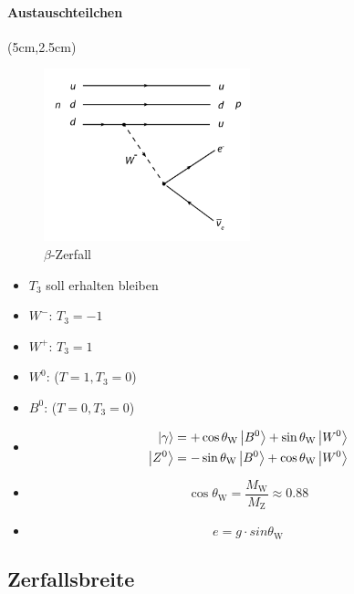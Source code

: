 \begin{iframe}


	\framesubtitle{Austauschteilchen}
	\begin{textblock*}{7cm}(5cm,2.5cm) %
		\begin{figure}
		\includegraphics[height=5cm]{img/betadecay}
		\caption*{$\beta$-Zerfall\cite{beta}}
	\end{figure}
	\end{textblock*}
	\begin{itemize}
		\pause
		\item $T_3$ soll erhalten bleiben
		\pause
		\item $W^-$: $T_3=-1$
		\pause
		\item $W^+$: $T_3=1$
		\pause
		\item $W^0$: ($T=1,T_3=0$)
		\item $B^0$: ($T=0,T_3=0$)
	\end{itemize}

\end{iframe}

\begin{iframe}
	\begin{itemize}
	\item
		\begin{align*}
		 \left|\gamma\right\rangle &= +\cos{\theta_\text{W}} \left|B^0\right\rangle + \sin{\theta_\text{W}} \left|W^0\right\rangle	\\
		\left|Z^0\right\rangle &= -\sin{\theta_\text{W}} \left|B^0\right\rangle + \cos{\theta_\text{W}} \left|W^0\right\rangle
		\end{align*}
		\pause
	\item
		\begin{equation*}
		\cos{\theta_\text{W}}=\frac{M_\text{W}}{M_\text{Z}} \approx 0.88
		\end{equation*}
	\pause
		\item
		\begin{equation*}
		e = g \cdot sin{\theta_\text{W}}
		\end{equation*}
	\end{itemize}

\end{iframe}

\subsection{Zerfallsbreite}
